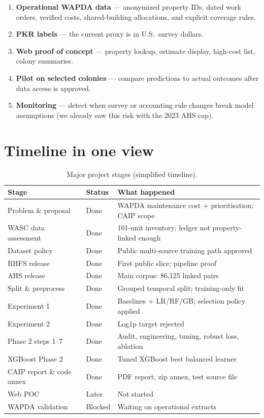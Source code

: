 \documentclass[11pt,a4paper]{article}
\begin{document}
\begin{enumerate}
  \item \textbf{Operational WAPDA data} --- anonymized property IDs, dated work orders, verified costs, shared-building allocations, and explicit coverage rules.
  \item \textbf{PKR labels} --- the current proxy is in U.S.\ survey dollars.
  \item \textbf{Web proof of concept} --- property lookup, estimate display, high-cost list, colony summaries.
  \item \textbf{Pilot on selected colonies} --- compare predictions to actual outcomes after data access is approved.
  \item \textbf{Monitoring} --- detect when survey or accounting rule changes break model assumptions (we already saw this risk with the 2023 AHS cap).
\end{enumerate}

\section{Timeline in one view}

\begin{table}[ht]
\centering
\caption{Major project stages (simplified timeline).}
\small
\begin{tabular}{@{}llp{7.8cm}@{}}
\toprule
Stage & Status & What happened \\
\midrule
Problem \& proposal & Done & WAPDA maintenance cost + prioritisation; CAIP scope \\
WASC data assessment & Done & 101-unit inventory; ledger not property-linked enough \\
Dataset policy & Done & Public multi-source training path approved \\
RHFS release & Done & First public slice; pipeline proof \\
AHS release & Done & Main corpus: 86,125 linked pairs \\
Split \& preprocess & Done & Grouped temporal split; training-only fit \\
Experiment 1 & Done & Baselines + LR/RF/GB; selection policy applied \\
Experiment 2 & Done & Log1p target rejected \\
Phase 2 steps 1--7 & Done & Audit, engineering, tuning, robust loss, ablation \\
XGBoost Phase 2 & Done & Tuned XGBoost best balanced learner \\
CAIP report \& code annex & Done & PDF report, zip annex, test source file \\
Web POC & Later & Not started \\
WAPDA validation & Blocked & Waiting on operational extracts \\
\bottomrule
\end{tabular}
\end{table}
\end{document}
